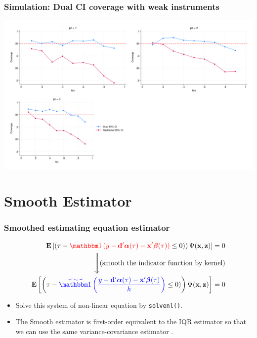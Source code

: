 \documentclass[11pt]{beamer}
\begin{document}
\begin{frame}
  \frametitle{Simulation: Dual CI coverage with weak instruments}
  \begin{center} 
\includegraphics[scale=0.2]{eps/dualci}
\end{center}
\end{frame}

\section{Smooth Estimator}
\begin{frame}
  \frametitle{Smoothed estimating equation estimator}
  \begin{align*}
    \E \left[
      \left( \tau - \myred{\I\left(y - \db'\alphab(\tau)  -
      \xb'\betab(\tau)\right)}
      \leq 0)
      \right)
    \Psi(\xb, \zb) \right]  = 0 \\
    \Bigg\Downarrow \text{(smooth the indicator function by kernel)} \\
    \E \left[
      \left( \tau - \myblue{\widetilde{\I}\left(\frac{y - \db'\alphab(\tau)  -
      \xb'\betab(\tau)}{h}\right)}
      \leq 0)
      \right)
    \Psi(\xb, \zb) \right]  = 0 \\
  \end{align*}

  \begin{itemize}
    \item Solve this system of non-linear equation by {\tt solvenl()}. 

    \item The Smooth estimator is first-order equivalent to the IQR estimator so
      that we can use the same variance-covariance estimator
      \citep{DeCastro2019}.
   \end{itemize}
  
\end{frame}
\end{document}
